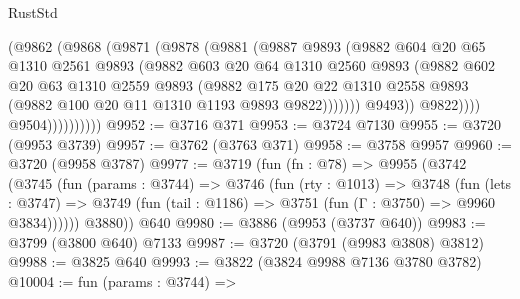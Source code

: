 \begin{lexlean}{RustStd}
\begin{coremodule}
                            (@9862
                              (@9868
                                (@9871
                                  (@9878
                                    (@9881
                                      (@9887
                                        @9893
                                        (@9882
                                          @604
                                          @20
                                          @65
                                          @1310
                                          @2561
                                          @9893
                                          (@9882
                                            @603
                                            @20
                                            @64
                                            @1310
                                            @2560
                                            @9893
                                            (@9882
                                              @602
                                              @20
                                              @63
                                              @1310
                                              @2559
                                              @9893
                                              (@9882
                                                @175
                                                @20
                                                @22
                                                @1310
                                                @2558
                                                @9893
                                                (@9882 @100 @20 @11 @1310 @1193 @9893 @9822)))))))
                                    @9493))
                                @9822))))
                        @9504))))))))))
@9952 := @3716 @371
@9953 := @3724 @7130
@9955 := @3720 (@9953 @3739)
@9957 := @3762 (@3763 @371)
@9958 := @3758 @9957
@9960 := @3720 (@9958 @3787)
@9977 := @3719
    (fun (fn : @78) =>
    @9955
      (@3742
        (@3745
          (fun (params : @3744) =>
          @3746
            (fun (rty : @1013) =>
            @3748
              (fun (lets : @3747) =>
              @3749 (fun (tail : @1186) => @3751 (fun (Γ : @3750) => @9960 @3834))))))
        @3880))
    @640
@9980 := @3886 (@9953 (@3737 @640))
@9983 := @3799 (@3800 @640) @7133
@9987 := @3720 (@3791 (@9983 @3808) @3812)
@9988 := @3825 @640
@9993 := @3822 (@3824 @9988 @7136 @3780 @3782)
@10004 := fun (params : @3744) =>

\end{coremodule}
\end{lexlean}
